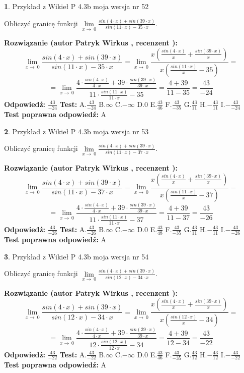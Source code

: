 \documentclass[12pt, a4paper]{article}
\theoremstyle{definition} %
\newtheorem{zad}{}
\newcommand{\zadStart}[1]{\begin{zad}#1\newline}
\newcommand{\zadStop}{\end{zad}}
\newcommand{\rozwStart}[2]{\noindent \textbf{Rozwiązanie (autor #1 , recenzent #2): }\newline}
\newcommand{\rozwStop}{\newline}
\newcommand{\odpStart}{\noindent \textbf{Odpowiedź:}\newline}
\newcommand{\odpStop}{\newline}
\newcommand{\testStart}{\noindent \textbf{Test:}\newline}
\newcommand{\testStop}{\newline}
\newcommand{\kluczStart}{\noindent \textbf{Test poprawna odpowiedź:}\newline}
\newcommand{\kluczStop}{\newline}
\begin{document}
\zadStart{Przykład z Wikieł P 4.3b moja wersja nr 52}


Obliczyć granicę funkcji $\lim\limits_{x\to\ 0}\frac{sin(4 \cdot x)+sin(39 \cdot x)}{sin(11 \cdot x)-35 \cdot x}$.
\zadStop
\rozwStart{Patryk Wirkus}{}
$$\lim\limits_{x\to\ 0}\frac{sin(4 \cdot x)+sin(39 \cdot x)}{sin(11 \cdot x)-35 \cdot x}=\lim\limits_{x\to\ 0}\frac{x(\frac{sin(4 \cdot x)}{x}+\frac{sin(39 \cdot x)}{x})}{x(\frac{sin(11 \cdot x)}{x}-35)}=$$
$$=\lim\limits_{x\to\ 0}\frac{4 \cdot \frac{sin(4 \cdot x)}{4 \cdot x}+39 \cdot \frac{sin(39 \cdot x)}{39 \cdot x}}{11 \cdot \frac{sin(11 \cdot x)}{11 \cdot x}-35}=\frac{4+39}{11-35} = \frac{43}{-24}$$
\rozwStop
\odpStart
$\frac{43}{-24}$
\odpStop
\testStart
A.$\frac{43}{-24}$
B.$\infty$
C.$-\infty$
D.$0$
E.$\frac{43}{46}$
F.$\frac{43}{-35}$
G.$\frac{43}{11}$
H.$-\frac{43}{11}$
I.$-\frac{43}{-24}$
\testStop
\kluczStart
A
\kluczStop



\zadStart{Przykład z Wikieł P 4.3b moja wersja nr 53}


Obliczyć granicę funkcji $\lim\limits_{x\to\ 0}\frac{sin(4 \cdot x)+sin(39 \cdot x)}{sin(11 \cdot x)-37 \cdot x}$.
\zadStop
\rozwStart{Patryk Wirkus}{}
$$\lim\limits_{x\to\ 0}\frac{sin(4 \cdot x)+sin(39 \cdot x)}{sin(11 \cdot x)-37 \cdot x}=\lim\limits_{x\to\ 0}\frac{x(\frac{sin(4 \cdot x)}{x}+\frac{sin(39 \cdot x)}{x})}{x(\frac{sin(11 \cdot x)}{x}-37)}=$$
$$=\lim\limits_{x\to\ 0}\frac{4 \cdot \frac{sin(4 \cdot x)}{4 \cdot x}+39 \cdot \frac{sin(39 \cdot x)}{39 \cdot x}}{11 \cdot \frac{sin(11 \cdot x)}{11 \cdot x}-37}=\frac{4+39}{11-37} = \frac{43}{-26}$$
\rozwStop
\odpStart
$\frac{43}{-26}$
\odpStop
\testStart
A.$\frac{43}{-26}$
B.$\infty$
C.$-\infty$
D.$0$
E.$\frac{43}{48}$
F.$\frac{43}{-35}$
G.$\frac{43}{11}$
H.$-\frac{43}{11}$
I.$-\frac{43}{-26}$
\testStop
\kluczStart
A
\kluczStop



\zadStart{Przykład z Wikieł P 4.3b moja wersja nr 54}


Obliczyć granicę funkcji $\lim\limits_{x\to\ 0}\frac{sin(4 \cdot x)+sin(39 \cdot x)}{sin(12 \cdot x)-34 \cdot x}$.
\zadStop
\rozwStart{Patryk Wirkus}{}
$$\lim\limits_{x\to\ 0}\frac{sin(4 \cdot x)+sin(39 \cdot x)}{sin(12 \cdot x)-34 \cdot x}=\lim\limits_{x\to\ 0}\frac{x(\frac{sin(4 \cdot x)}{x}+\frac{sin(39 \cdot x)}{x})}{x(\frac{sin(12 \cdot x)}{x}-34)}=$$
$$=\lim\limits_{x\to\ 0}\frac{4 \cdot \frac{sin(4 \cdot x)}{4 \cdot x}+39 \cdot \frac{sin(39 \cdot x)}{39 \cdot x}}{12 \cdot \frac{sin(12 \cdot x)}{12 \cdot x}-34}=\frac{4+39}{12-34} = \frac{43}{-22}$$
\rozwStop
\odpStart
$\frac{43}{-22}$
\odpStop
\testStart
A.$\frac{43}{-22}$
B.$\infty$
C.$-\infty$
D.$0$
E.$\frac{43}{46}$
F.$\frac{43}{-35}$
G.$\frac{43}{12}$
H.$-\frac{43}{12}$
I.$-\frac{43}{-22}$
\testStop
\kluczStart
A
\kluczStop
\end{document}
